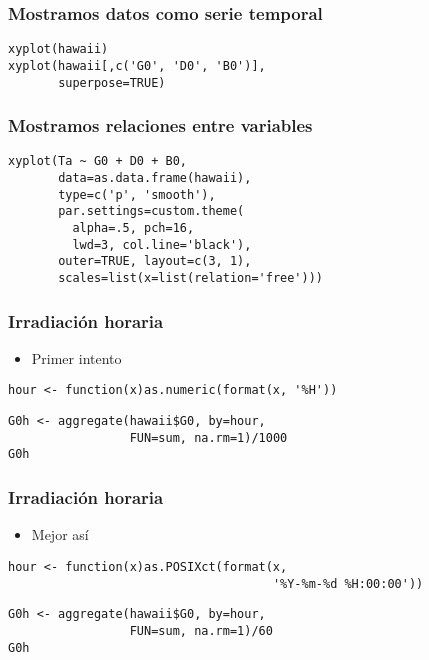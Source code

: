 \documentclass{beamer}
\begin{document}
\begin{frame}[fragile]
\frametitle{Mostramos datos como serie temporal}
\label{sec-5-3}


\lstset{language=R}
\begin{lstlisting}
xyplot(hawaii)
xyplot(hawaii[,c('G0', 'D0', 'B0')],
       superpose=TRUE)
\end{lstlisting}
\end{frame}
\begin{frame}[fragile]
\frametitle{Mostramos relaciones entre variables}
\label{sec-5-4}


\lstset{language=R}
\begin{lstlisting}
xyplot(Ta ~ G0 + D0 + B0,
       data=as.data.frame(hawaii),
       type=c('p', 'smooth'),
       par.settings=custom.theme(
         alpha=.5, pch=16,
         lwd=3, col.line='black'),
       outer=TRUE, layout=c(3, 1),
       scales=list(x=list(relation='free')))
\end{lstlisting}
\end{frame}
\begin{frame}[fragile]
\frametitle{Irradiación horaria}
\label{sec-5-5}

\begin{itemize}
\item Primer intento
\end{itemize}

\lstset{language=R}
\begin{lstlisting}
hour <- function(x)as.numeric(format(x, '%H'))
\end{lstlisting}


\lstset{language=R}
\begin{lstlisting}
G0h <- aggregate(hawaii$G0, by=hour,
                 FUN=sum, na.rm=1)/1000
G0h
\end{lstlisting}
\end{frame}
\begin{frame}[fragile]
\frametitle{Irradiación horaria}
\label{sec-5-6}


\begin{itemize}
\item Mejor así
\end{itemize}

\lstset{language=R}
\begin{lstlisting}
hour <- function(x)as.POSIXct(format(x,
                                     '%Y-%m-%d %H:00:00'))
\end{lstlisting}


\lstset{language=R}
\begin{lstlisting}
G0h <- aggregate(hawaii$G0, by=hour,
                 FUN=sum, na.rm=1)/60
G0h
\end{lstlisting}
\end{frame}
\end{document}
